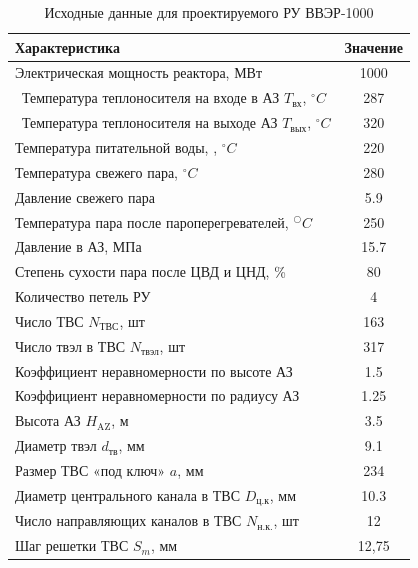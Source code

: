 \begin{table}[H]
	\caption{Исходные данные для проектируемого РУ ВВЭР-1000}
	\begin{center}
        \begin{tabular}{|l|c|}
        \toprule
         Характеристика & Значение \\ 
         \midrule
         \hline
         Электрическая мощность реактора, МВт & 1000 \\
         \hline\ 
         Температура теплоносителя на входе в АЗ $T_{\text{вх}}$, $^\circ C$  & 287 \\ 
         \hline\
         Температура теплоносителя на выходе АЗ $T_{\text{вых}}$, $^\circ C$ & 320 \\ 
         \hline
         Температура питательной воды, , $^\circ C$ & 220 \\ 
         \hline
         Температура свежего пара, $^\circ C$  &  280 \\ 
         \hline
         Давление свежего пара & 5.9 \\ 
         \hline
         Температура пара после пароперегревателей, $^○C$ & 250 \\ 
         \hline
         Давление в АЗ, МПа & 15.7 \\ 
         \hline
         Степень сухости пара после ЦВД и ЦНД, \% & 80 \\ 
         \hline
         Количество петель РУ & 4 \\ 
         \hline
         Число ТВС $N_{\text{ТВС}}$, шт  & 163 \\ 
         \hline
         Число твэл в ТВС $N_{\text{твэл}}$, шт & 317 \\ 
         \hline
         Коэффициент неравномерности по высоте АЗ  & 1.5 \\ 
         \hline
         Коэффициент неравномерности по радиусу АЗ & 1.25 \\ 
         \hline
         Высота АЗ $H_{\text{AZ}}$, м & 3.5 \\ 
         \hline
         Диаметр твэл $d_{\text{тв}}$, мм & 9.1 \\ 
         \hline
         Размер ТВС «под ключ» $a$, мм & 234 \\ 
         \hline
         Диаметр центрального канала в ТВС $D_{\text{ц.к}}$, мм & 10.3 \\ 
         \hline
         Число направляющих каналов в ТВС $N_{\text{н.к.}}$, шт & 12 \\ 
         \hline
         Шаг решетки ТВС $S_m$, мм & 12,75 \\ 

\end{tabular}
\end{center}
\end{table}
